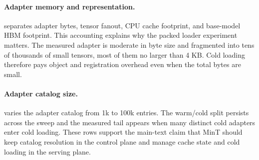 \paragraph{Adapter memory and representation.}
 separates adapter bytes, tensor fanout, CPU cache footprint, and base-model HBM footprint. This accounting explains why the packed loader experiment matters. The measured adapter is moderate in byte size and fragmented into tens of thousands of small tensors, most of them no larger than 4 KB. Cold loading therefore pays object and registration overhead even when the total bytes are small.

\begin{table}[H]
\centering
\scriptsize
\setlength{\tabcolsep}{4pt}
\renewcommand{\arraystretch}{1.08}
\caption{Memory and representation accounting for the measured 30B MoE LoRA adapter files. The rows separate byte size from object fanout and cache pressure.}
\label{tab:app_memory_loader_accounting}
\end{table}

\paragraph{Adapter catalog size.}
 varies the adapter catalog from 1k to 100k entries. The warm/cold split persists across the sweep and the measured tail appears when many distinct cold adapters enter cold loading. These rows support the main-text claim that MinT should keep catalog resolution in the control plane and manage cache state and cold loading in the serving plane.

